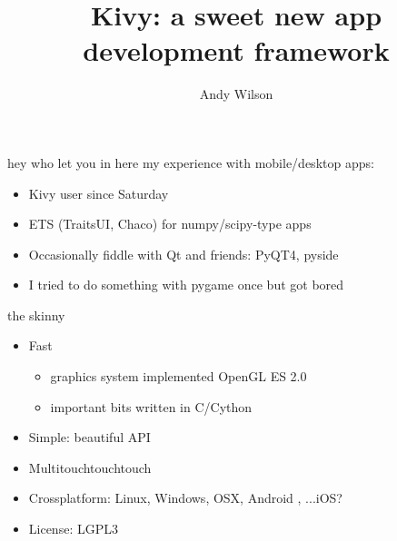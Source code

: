\documentclass{beamer}
\title[Kivy]{Kivy: a sweet new app development framework}
\author{Andy Wilson}
\begin{document}
\begin{frame}[plain]
  \titlepage
\end{frame}


\begin{frame}{hey who let you in here}
my experience with mobile/desktop apps:

\pause
\begin{itemize}
  \item Kivy user since Saturday
  \pause
  \item ETS (TraitsUI, Chaco) for numpy/scipy-type apps
  \pause
  \item Occasionally fiddle with Qt and friends: PyQT4, pyside
  \pause
  \item I tried to do something with pygame once but got bored
\end{itemize}
\end{frame}


\begin{frame}{the skinny}
\begin{itemize}
  \item Fast
    \pause
    \begin{itemize}
    \item graphics system implemented OpenGL ES 2.0
    \pause
    \item important bits written in C/Cython
    \end{itemize}
  \pause
  \item Simple: beautiful API
  \pause
  \item Multitouchtouchtouch
  \pause
  \item Crossplatform: Linux, Windows, OSX, Android
  \pause
  , ...iOS?
  \pause
  \item License: LGPL3
\end{itemize}
\end{frame}
\end{document}
